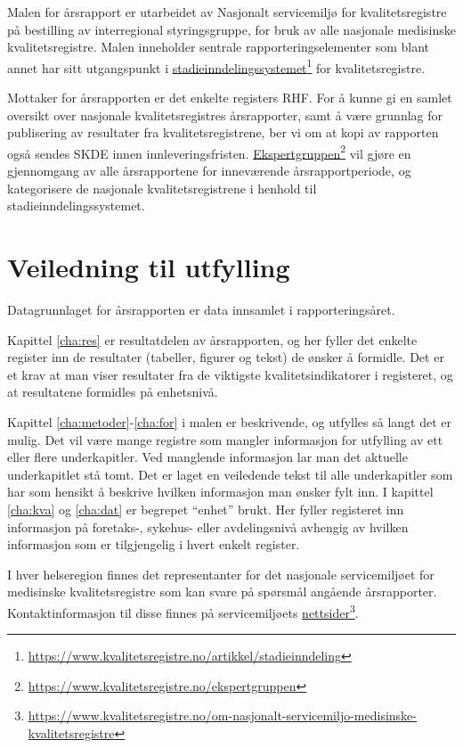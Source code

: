 \documentclass[norsk, a4paper, twocolumn]{report}
\begin{document}
Malen for årsrapport er utarbeidet av Nasjonalt servicemiljø for
kvalitetsregistre på bestilling av interregional styringsgruppe, for bruk av
alle nasjonale medisinske kvalitetsregistre. Malen inneholder sentrale
rapporteringselementer som blant annet har sitt utgangspunkt i
\href{https://www.kvalitetsregistre.no/artikkel/stadieinndeling}{stadieinndelingssystemet}\footnote{\url{https://www.kvalitetsregistre.no/artikkel/stadieinndeling}}
for kvalitetsregistre.

Mottaker for årsrapporten er det enkelte registers RHF. For å kunne gi en
samlet oversikt over nasjonale kvalitetsregistres årsrapporter, samt å være
grunnlag for publisering av resultater fra kvalitetsregistrene, ber vi om at
kopi av rapporten også sendes SKDE innen innleveringsfristen.
\href{https://www.kvalitetsregistre.no/ekspertgruppen}{Ekspertgruppen}\footnote{\url{https://www.kvalitetsregistre.no/ekspertgruppen}}
vil gjøre en gjennomgang av alle årsrapportene for inneværende
årsrapportperiode, og kategorisere de nasjonale kvalitetsregistrene i henhold
til stadieinndelingssystemet.


\section*{Veiledning til utfylling}
Datagrunnlaget for årsrapporten er data innsamlet i rapporteringsåret.

Kapittel \ref{cha:res} er resultatdelen av årsrapporten, og her fyller det
enkelte register inn de resultater (tabeller, figurer og tekst) de ønsker å
formidle. Det er et krav at man viser resultater fra de viktigste
kvalitetsindikatorer i registeret, og at resultatene formidles på enhetsnivå.

Kapittel \ref{cha:metoder}-\ref{cha:for} i malen er beskrivende, og utfylles så
langt det er mulig. Det vil være mange registre som mangler informasjon for
utfylling av ett eller flere underkapitler. Ved manglende informasjon lar man
det aktuelle underkapitlet stå tomt. Det er laget en veiledende tekst til alle
underkapitler som har som hensikt å beskrive hvilken informasjon man ønsker fylt
inn. I kapittel \ref{cha:kva} og \ref{cha:dat} er begrepet ``enhet'' brukt.
Her fyller registeret inn informasjon på foretaks-, sykehus- eller avdelingsnivå
avhengig av hvilken informasjon som er tilgjengelig i hvert enkelt register. 

I hver helseregion finnes det representanter for det nasjonale
servicemiljøet for medisinske kvalitetsregistre som kan svare på spørsmål
angående årsrapporter. Kontaktinformasjon til disse finnes på servicemiljøets
\href{https://www.kvalitetsregistre.no/om-nasjonalt-servicemiljo-medisinske-kvalitetsregistre}{nettsider}\footnote{\url{https://www.kvalitetsregistre.no/om-nasjonalt-servicemiljo-medisinske-kvalitetsregistre}}.
\end{document}
